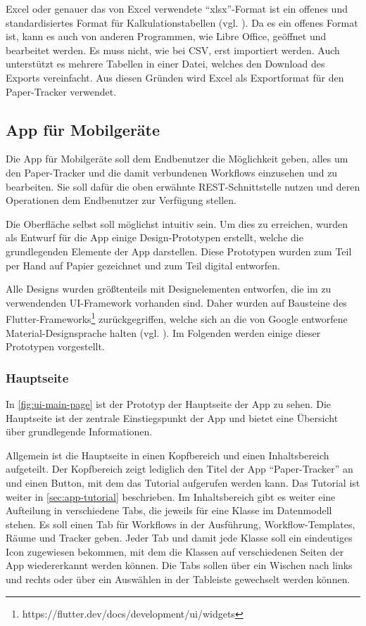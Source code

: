 Excel oder genauer das von Excel verwendete \enquote{xlsx}-Format ist ein offenes und standardisiertes Format
für Kalkulationstabellen (vgl. \cite{iso29500}).
Da es ein offenes Format ist, kann es auch von anderen Programmen, wie Libre Office, geöffnet und bearbeitet werden.
Es muss nicht, wie bei \gls{CSV}, erst importiert werden.
Auch unterstützt es mehrere Tabellen in einer Datei, welches den Download des Exports vereinfacht.
Aus diesen Gründen wird Excel als Exportformat für den Paper-Tracker verwendet.

\FloatBarrier
\subsection{App für Mobilgeräte} \label{sec:app}

Die App für Mobilgeräte soll dem Endbenutzer die Möglichkeit geben, alles um den Paper-Tracker und die damit verbundenen Workflows einzusehen und zu bearbeiten.
Sie soll dafür die oben erwähnte \gls{REST}-Schnittstelle nutzen und deren Operationen dem Endbenutzer zur Verfügung stellen.

Die Oberfläche selbst soll möglichst intuitiv sein.
Um dies zu erreichen, wurden als Entwurf für die App einige Design-Prototypen erstellt, welche die grundlegenden Elemente der App darstellen.
Diese Prototypen wurden zum Teil per Hand auf Papier gezeichnet und zum Teil digital entworfen.

Alle Designs wurden größtenteils mit Designelementen entworfen, die im zu verwendenden \gls{UI}-Framework vorhanden sind.
Daher wurden auf Bausteine des
Flutter-Frameworks\footnote{https://flutter.dev/docs/development/ui/widgets} zurückgegriffen, welche
sich an die von Google entworfene Material-Designsprache halten (vgl. \cite{Google2020}).
Im Folgenden werden einige dieser Prototypen vorgestellt.

\FloatBarrier
\subsubsection{Hauptseite}

In \autoref{fig:ui-main-page} ist der Prototyp der Hauptseite der App zu sehen.
Die Hauptseite ist der zentrale Einstiegspunkt der App und bietet eine Übersicht über grundlegende
Informationen.

Allgemein ist die Hauptseite in einen Kopfbereich und einen Inhaltsbereich aufgeteilt.
Der Kopfbereich zeigt lediglich den Titel der App \enquote{Paper-Tracker} an und einen Button, mit dem das Tutorial aufgerufen werden kann.
Das Tutorial ist weiter in \autoref{sec:app-tutorial} beschrieben.
Im Inhaltsbereich gibt es weiter eine Aufteilung in verschiedene Tabs, die jeweils für eine Klasse im Datenmodell stehen.
Es soll einen Tab für Workflows in der Ausführung, Workflow-Templates, Räume und Tracker geben.
Jeder Tab und damit jede Klasse soll ein eindeutiges Icon zugewiesen bekommen, mit dem die Klassen auf verschiedenen Seiten der App wiedererkannt werden können.
Die Tabs sollen über ein Wischen nach links und rechts oder über ein Auswählen in der Tableiste gewechselt werden können.

